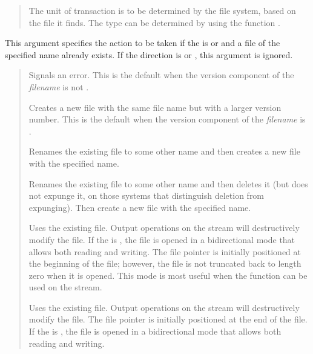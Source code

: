 \begin{defun}[Function]
\begin{flushdesc}
\begin{quotation}
\begin{flushdesc}
\item[\cd{:default}]
The unit of transaction is to be determined by the file system, based
on the file it finds.
The type can be determined by using the function .
\end{flushdesc}
\end{quotation}

\item[\cd{:if-exists}]
This argument specifies the action to be taken if the  is
 or  and a file of the specified name already exists.
If the direction is  or , this argument is ignored.
\begin{quotation}
\begin{flushdesc}
\item[\cd{:error}]
Signals an error.  This is the default when the version component of
the \emph{filename} is not .

\item[\cd{:new-version}]
Creates a new file with the same file name but with a larger version number.
This is the default when the version component of the \emph{filename} is .

\item[\cd{:rename}]
Renames the existing file to some other name and then creates a new file
with the specified name.

\item[\cd{:rename-and-delete}]
Renames the existing file to some other name and then deletes it (but
does not expunge it, on those systems that distinguish deletion from
expunging).  Then create a new file with the specified name.

\item[\cd{:overwrite}]
Uses the existing file.  Output operations on the stream
will destructively modify the file.
If the  is ,
the file is opened in a bidirectional mode that allows both
reading and writing.  The file pointer is initially positioned
at the beginning of the file; however, the file is not truncated
back to length zero when it is opened.
This mode is most useful when
the  function can be used on the stream.

\item[\cd{:append}]
Uses the existing file.  Output operations on the stream
will destructively modify the file.  The file pointer is
initially positioned at the end of the file.
If the  is ,
the file is opened in a bidirectional mode that allows both
reading and writing.


\end{flushdesc}
\end{quotation}
\end{flushdesc}
\end{defun}
